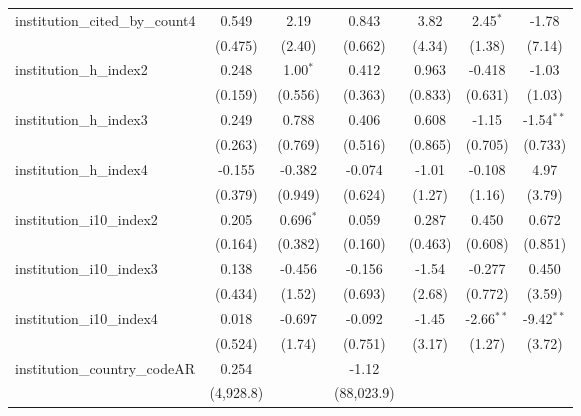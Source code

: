 \begin{tabular}{lcccccc}
   institution\_cited\_by\_count4        & 0.549         & 2.19        & 0.843         & 3.82         & 2.45$^{*}$   & -1.78\\   
                                         & (0.475)       & (2.40)      & (0.662)       & (4.34)       & (1.38)       & (7.14)\\   
   institution\_h\_index2                & 0.248         & 1.00$^{*}$  & 0.412         & 0.963        & -0.418       & -1.03\\   
                                         & (0.159)       & (0.556)     & (0.363)       & (0.833)      & (0.631)      & (1.03)\\   
   institution\_h\_index3                & 0.249         & 0.788       & 0.406         & 0.608        & -1.15        & -1.54$^{**}$\\   
                                         & (0.263)       & (0.769)     & (0.516)       & (0.865)      & (0.705)      & (0.733)\\   
   institution\_h\_index4                & -0.155        & -0.382      & -0.074        & -1.01        & -0.108       & 4.97\\   
                                         & (0.379)       & (0.949)     & (0.624)       & (1.27)       & (1.16)       & (3.79)\\   
   institution\_i10\_index2              & 0.205         & 0.696$^{*}$ & 0.059         & 0.287        & 0.450        & 0.672\\   
                                         & (0.164)       & (0.382)     & (0.160)       & (0.463)      & (0.608)      & (0.851)\\   
   institution\_i10\_index3              & 0.138         & -0.456      & -0.156        & -1.54        & -0.277       & 0.450\\   
                                         & (0.434)       & (1.52)      & (0.693)       & (2.68)       & (0.772)      & (3.59)\\   
   institution\_i10\_index4              & 0.018         & -0.697      & -0.092        & -1.45        & -2.66$^{**}$ & -9.42$^{**}$\\   
                                         & (0.524)       & (1.74)      & (0.751)       & (3.17)       & (1.27)       & (3.72)\\   
   institution\_country\_codeAR          & 0.254         &             & -1.12         &              &              &   \\   
                                         & (4,928.8)     &             & (88,023.9)    &              &              &   \\   

\end{tabular}
